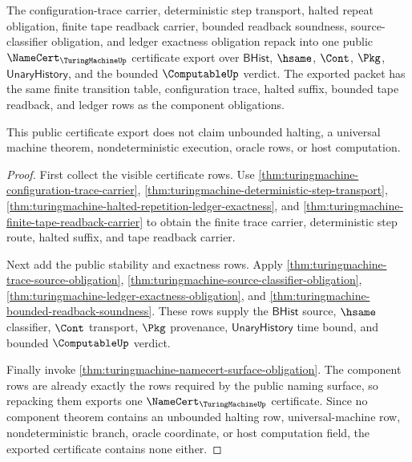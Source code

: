 \begin{theorem}
\label{thm:turingmachine-public-certificate-export}
The configuration-trace carrier, deterministic step transport, halted repeat
obligation, finite tape readback carrier, bounded readback soundness,
source-classifier obligation, and ledger exactness obligation repack into one
public $\NameCert_{\TuringMachineUp}$ certificate export over $\mathsf{BHist}$,
$\hsame$, $\Cont$, $\Pkg$, $\mathsf{UnaryHistory}$, and the bounded
$\ComputableUp$ verdict. The exported packet has the same finite transition
table, configuration trace, halted suffix, bounded tape readback, and ledger
rows as the component obligations.

This public certificate export does not claim unbounded halting, a universal
machine theorem, nondeterministic execution, oracle rows, or host computation.
\end{theorem}
\begin{proof}
First collect the visible certificate rows. Use
\autoref{thm:turingmachine-configuration-trace-carrier},
\autoref{thm:turingmachine-deterministic-step-transport},
\autoref{thm:turingmachine-halted-repetition-ledger-exactness}, and
\autoref{thm:turingmachine-finite-tape-readback-carrier} to obtain the finite
trace carrier, deterministic step route, halted suffix, and tape readback
carrier.

Next add the public stability and exactness rows. Apply
\autoref{thm:turingmachine-trace-source-obligation},
\autoref{thm:turingmachine-source-classifier-obligation},
\autoref{thm:turingmachine-ledger-exactness-obligation}, and
\autoref{thm:turingmachine-bounded-readback-soundness}. These rows supply the
$\mathsf{BHist}$ source, $\hsame$ classifier, $\Cont$ transport, $\Pkg$
provenance, $\mathsf{UnaryHistory}$ time bound, and bounded $\ComputableUp$
verdict.

Finally invoke \autoref{thm:turingmachine-namecert-surface-obligation}. The
component rows are already exactly the rows required by the public naming
surface, so repacking them exports one $\NameCert_{\TuringMachineUp}$
certificate. Since no component theorem contains an unbounded halting row,
universal-machine row, nondeterministic branch, oracle coordinate, or host
computation field, the exported certificate contains none either.
\end{proof}

